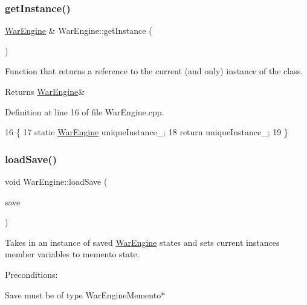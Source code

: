 \subsubsection{\texorpdfstring{get\+Instance()}{getInstance()}}
{\footnotesize\ttfamily \hyperlink{classWarEngine}{War\+Engine} \& War\+Engine\+::get\+Instance (\begin{DoxyParamCaption}{ }\end{DoxyParamCaption})\hspace{0.3cm}{\ttfamily [static]}}



Function that returns a reference to the current (and only) instance of the class. 

\begin{DoxyReturn}{Returns}
\hyperlink{classWarEngine}{War\+Engine}\& 
\end{DoxyReturn}


Definition at line 16 of file War\+Engine.\+cpp.


\begin{DoxyCode}
16                                  \{
17     \textcolor{keyword}{static} \hyperlink{classWarEngine}{WarEngine} uniqueInstance\_;
18     \textcolor{keywordflow}{return} uniqueInstance\_;
19 \}
\end{DoxyCode}
\mbox{\label{classWarEngine_a715995a703811197d16102ca80bf6fca}} 
\subsubsection{\texorpdfstring{load\+Save()}{loadSave()}}
{\footnotesize\ttfamily void War\+Engine\+::load\+Save (\begin{DoxyParamCaption}\item[{\hyperlink{classWarEngineMemento}{War\+Engine\+Memento} $\ast$}]{save }\end{DoxyParamCaption})}



Takes in an instance of saved \hyperlink{classWarEngine}{War\+Engine} states and sets current instance\textquotesingle{}s member variables to memento state. 

Preconditions\+:
\begin{DoxyItemize}
\item Save must be of type War\+Engine\+Memento$\ast$
\end{DoxyItemize}

